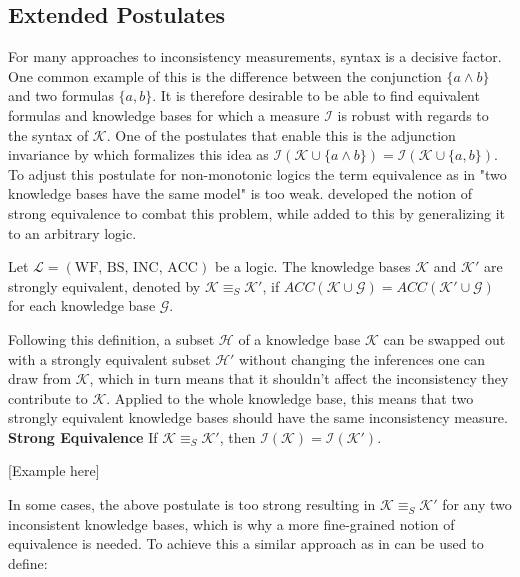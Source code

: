 \subsection{Extended Postulates}
For many approaches to inconsistency measurements, syntax is a decisive factor. One common example of this is the difference between the conjunction \(\{a \land b\}\) and two formulas \(\{a, b\}\). It is therefore desirable to be able to find equivalent formulas and knowledge bases for which a measure \(\mathcal{I}\) is robust with regards to the syntax of \(\mathcal{K}\). One of the postulates that enable this is the adjunction invariance by \cite{ferme_revisiting_2014} which formalizes this idea as \(\mathcal{I}(\mathcal{K} \cup \{a \land b\}) = \mathcal{I}(\mathcal{K} \cup \{a, b\})\).
To adjust this postulate for non-monotonic logics the term equivalence as in "two knowledge bases have the same model" is too weak. \cite{lifschitz_strongly_2001} developed the notion of strong equivalence to combat this problem, while \cite{brewka_strong_2019} added to this by generalizing it to an arbitrary logic.

\begin{definition}
    Let \(\mathcal{L} = (\text{WF, BS, INC, ACC})\) be a logic. The knowledge bases \(\mathcal{K}\) and \(\mathcal{K}'\) are strongly equivalent, denoted by \(\mathcal{K} \equiv_S  \mathcal{K}'\), if \(ACC(\mathcal{K} \cup \mathcal{G}) = ACC(\mathcal{K}' \cup \mathcal{G})\) for each knowledge base \(\mathcal{G}\).
\end{definition}

Following this definition, a subset \(\mathcal{H}\) of a knowledge base \(\mathcal{K}\) can be swapped out with a strongly equivalent subset \(\mathcal{H}'\) without changing the inferences one can draw from \(\mathcal{K}\), which in turn means that it shouldn't affect the inconsistency they contribute to \(\mathcal{K}\). Applied to the whole knowledge base, this means that two strongly equivalent knowledge bases should have the same inconsistency measure.
\\
\textbf{Strong Equivalence}
If \(\mathcal{K} \equiv_S \mathcal{K}'\), then \(\mathcal{I}(\mathcal{K}) = \mathcal{I}(\mathcal{K}')\).

    [Example here]

In some cases, the above postulate is too strong resulting in \(\mathcal{K} \equiv_S \mathcal{K}'\) for any two inconsistent knowledge bases, which is why a more fine-grained notion of equivalence is needed. To achieve this a similar approach as in \cite{thimm_inconsistency_2013} can be used to define:

